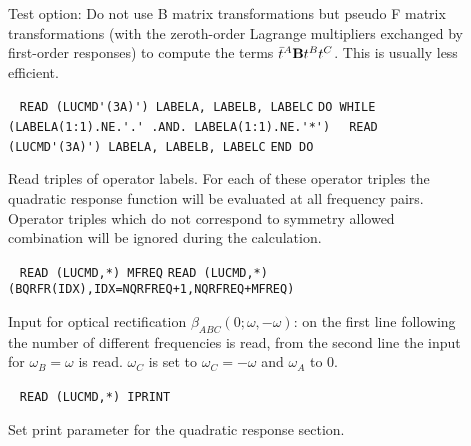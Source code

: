 \begin{description}
\item[] 
Test option:
Do not use B matrix transformations but pseudo F matrix 
transformations (with the zeroth-order Lagrange multipliers 
exchanged by first-order responses) to compute the terms
$\bar{t}^A {\bf B} t^{B} t^{C}$. This is usually less
efficient.

\item[] \verb| |\newline
\verb|READ (LUCMD'(3A)') LABELA, LABELB, LABELC|\newline
\verb|DO WHILE (LABELA(1:1).NE.'.' .AND. LABELA(1:1).NE.'*')|\newline
\verb|  READ (LUCMD'(3A)') LABELA, LABELB, LABELC|\newline
\verb|END DO|

Read triples of operator labels. 
For each of these operator triples the quadratic response
function will be evaluated at all frequency pairs.
Operator triples which do not correspond to symmetry allowed
combination will be ignored during the calculation.
 
\item[]  \verb| |\newline
   \verb|READ (LUCMD,*) MFREQ|\newline
   \verb|READ (LUCMD,*) (BQRFR(IDX),IDX=NQRFREQ+1,NQRFREQ+MFREQ)|

   Input for optical rectification $\beta_{ABC}(0;\omega,-\omega)$:
   on the first line following  the number of different
   frequencies is read, from the second line the input for 
   $\omega_B = \omega$ is read. $\omega_C$ is set to $\omega_C = -\omega$ and
   $\omega_A$ to $0$.

\item[] \verb| |\newline
     \verb|READ (LUCMD,*) IPRINT|

     Set print parameter for the quadratic response section.
 
 

\end{description}

